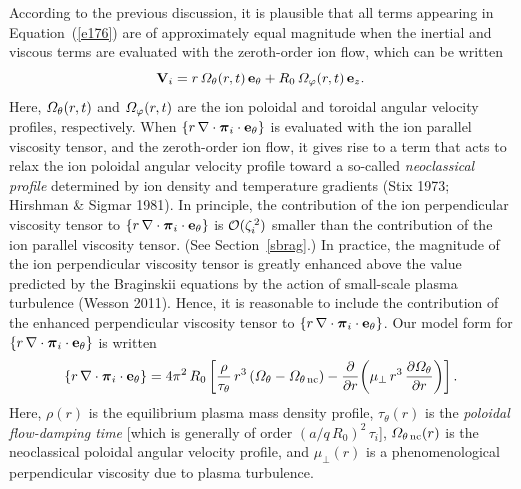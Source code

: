 \documentclass[notitlepage,12pt]{article}
\newcommand{\bpi}{\mbox{\boldmath$\pi$}}
\begin{document}
According to the previous discussion, it is plausible that all terms appearing in Equation~(\ref{e176}) are of approximately equal
magnitude when the inertial and viscous terms are evaluated with the zeroth-order ion flow, which can be written
\begin{equation}
{\bf V}_i = r\,{\mit\Omega}_\theta(r,t)\,{\bf e}_\theta + R_0\,{\mit\Omega}_\varphi(r,t)\,{\bf e}_z.
\end{equation}
Here, ${\mit\Omega}_\theta(r,t)$ and ${\mit\Omega}_\varphi(r,t)$ are the ion poloidal and toroidal angular velocity
profiles, respectively. When $\{ r\,\nabla\cdot \bpi_i\cdot{\bf e}_\theta\}$ is evaluated with  the ion parallel viscosity tensor, and the zeroth-order
ion flow, it gives rise to a term that acts to relax the ion poloidal angular velocity profile toward a so-called {\em neoclassical
profile}\/ determined by ion density and temperature gradients (Stix 1973; Hirshman \& Sigmar 1981). In principle, the
contribution of the ion perpendicular viscosity tensor to $\{ r\,\nabla\cdot \bpi_i\cdot{\bf e}_\theta\}$ 
is ${\cal O}(\zeta_i^{\,2})$ smaller than the contribution of the ion parallel viscosity tensor. (See Section~\ref{sbrag}.) In practice, the magnitude of the ion perpendicular
viscosity tensor is greatly enhanced above the value predicted by the Braginskii equations by the action of small-scale
plasma turbulence (Wesson 2011). Hence, it is reasonable to include the contribution of the enhanced perpendicular
viscosity tensor to $\{ r\,\nabla\cdot \bpi_i\cdot{\bf e}_\theta\}$. Our model form for $\{ r\,\nabla\cdot \bpi_i\cdot{\bf e}_\theta\}$ is written
\begin{equation}\label{e178}
\{ r\,\nabla\cdot \bpi_i\cdot{\bf e}_\theta\} = 4\pi^2\,R_0\left[ \frac{\rho}{\tau_\theta}\,r^3\,({\mit\Omega}_\theta-{\mit\Omega}_{\theta\,{\rm nc}}) -\frac{\partial}{\partial r}\!\left(\mu_\perp\,r^3\,\frac{\partial{\mit\Omega}_\theta}{\partial r}\right)\right].
\end{equation}
Here, $\rho(r)$ is the equilibrium plasma mass density profile, $\tau_\theta(r)$ is the {\em poloidal flow-damping time}\/ [which
is generally of order $(a/q\,R_0)^2\,\tau_i$], ${\mit\Omega}_{\theta\,{\rm nc}}(r)$ is the neoclassical poloidal angular velocity profile, and
$\mu_\perp(r)$ is a phenomenological perpendicular viscosity due to plasma turbulence. 
\end{document}
